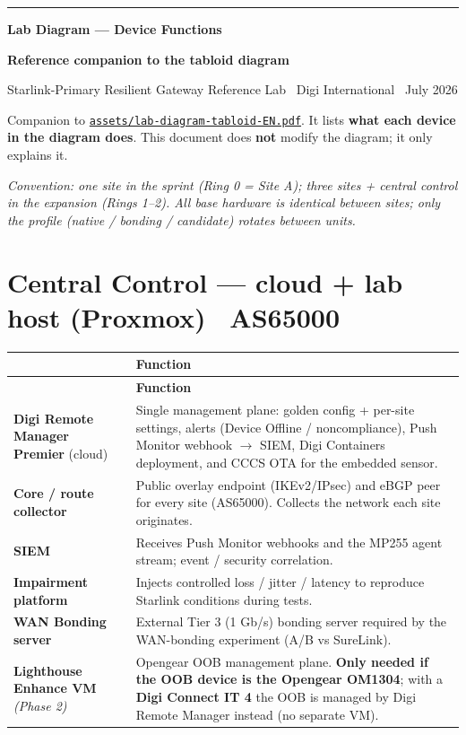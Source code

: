 \documentclass[10pt,letterpaper]{article}
\makeatletter
\newcommand{\kf}[1]{\textbf{\textcolor{PrimaryBlue}{#1}}}
\newcommand{\dtophead}{%
  \rowcolor{PrimaryBlue}{\color{white}\bfseries Device} & {\color{white}\bfseries Function}\\}
\newenvironment{devtable}{%
  \setlength{\arrayrulewidth}{0.4pt}\arrayrulecolor{black!15}%
  \renewcommand{\arraystretch}{1.28}%
  \begin{longtable}{@{}>{\raggedright\arraybackslash}p{4.4cm}@{\hspace{9pt}}>{\raggedright\arraybackslash}p{11.9cm}@{}}
  \dtophead \hline \endfirsthead \dtophead \hline \endhead}
  {\end{longtable}}
\makeatother
\begin{document}
{\color{AccentBlue}\rule{\linewidth}{4pt}}
\vspace{7pt}
{\LARGE\bfseries\color{Slate} Lab Diagram --- Device Functions\par}
\vspace{3pt}
{\large\bfseries\color{PrimaryBlue} Reference companion to the tabloid diagram\par}
\vspace{3pt}
{\small\color{Muted} Starlink-Primary Resilient Gateway Reference Lab \textbullet\ Digi International \textbullet\ July 2026\par}

\vspace{6pt}
Companion to \href{run:assets/lab-diagram-tabloid-EN.pdf}{\texttt{assets/lab-diagram-tabloid-EN.pdf}}. It lists \kf{what each device in the diagram does}. This document does \textbf{not} modify the diagram; it only explains it.

\vspace{2pt}
{\small\color{Muted}\textit{Convention: one site in the sprint (Ring 0 = Site A); three sites + central control in the expansion (Rings 1--2). All base hardware is identical between sites; only the profile (native / bonding / candidate) rotates between units.}}

\section{Central Control --- cloud + lab host (Proxmox) \textbullet\ AS65000}
\begin{devtable}
\textbf{Digi Remote Manager Premier} (cloud) & Single management plane: golden config + per-site settings, alerts (Device Offline / noncompliance), Push Monitor webhook $\rightarrow$ SIEM, Digi Containers deployment, and CCCS OTA for the embedded sensor. \\ \hline
\textbf{Core / route collector} & Public overlay endpoint (IKEv2/IPsec) and eBGP peer for every site (AS65000). Collects the network each site originates. \\ \hline
\textbf{SIEM} & Receives Push Monitor webhooks and the MP255 agent stream; event / security correlation. \\ \hline
\textbf{Impairment platform} & Injects controlled loss / jitter / latency to reproduce Starlink conditions during tests. \\ \hline
\textbf{WAN Bonding server} & External Tier 3 (1 Gb/s) bonding server required by the WAN-bonding experiment (A/B vs SureLink). \\ \hline
\textbf{Lighthouse Enhance VM} \textit{(Phase 2)} & Opengear OOB management plane. \kf{Only needed if the OOB device is the Opengear OM1304}; with a \kf{Digi Connect IT 4} the OOB is managed by Digi Remote Manager instead (no separate VM). \\
\end{devtable}
\end{document}
